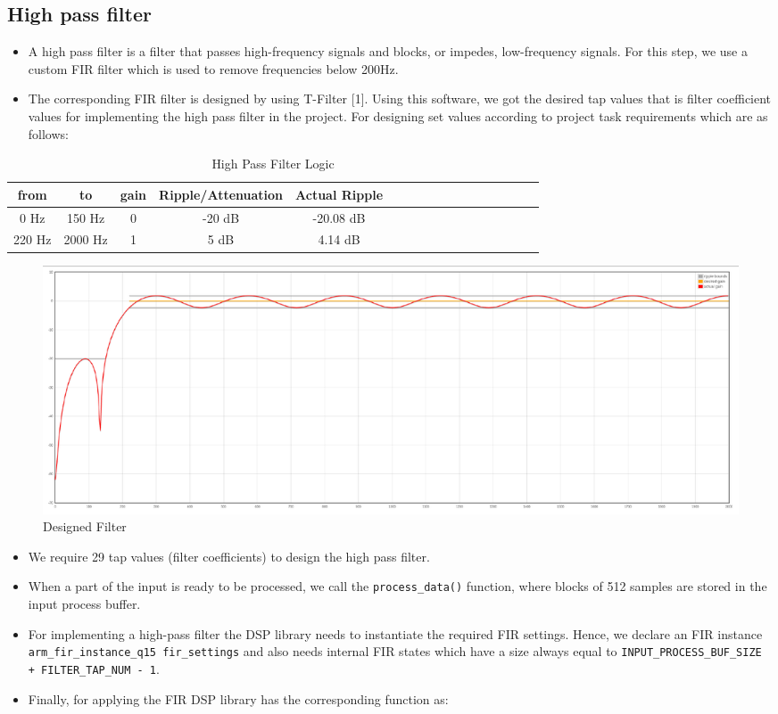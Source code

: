 \documentclass[11pt]{article}
\begin{document}
\subsection{High pass filter}
\label{sec:org4788e25}

\begin{itemize}
\item A high pass filter is a filter that passes high-frequency signals and blocks, or impedes, low-frequency signals. For this step, we use a custom FIR filter which is used to remove frequencies below 200Hz.
\item The corresponding FIR filter is designed by using T-Filter [1]. Using this software, we got the desired tap values that is filter coefficient values for implementing the high pass filter in the project. For designing set values according to project task requirements which are as follows:
\end{itemize}


\begin{table}[htbp]
\caption{High Pass Filter Logic}
\centering
\begin{tabular}{|c|c|c|c|c|c|c|c|c|c|c|c|c|c|c|c|c|}
\hline
from & to & gain & Ripple/Attenuation & Actual Ripple\\[0pt]
\hline
0 Hz & 150 Hz & 0 & -20 dB & -20.08 dB\\[0pt]
220 Hz & 2000 Hz & 1 & 5 dB & 4.14 dB\\[0pt]
\hline
\end{tabular}
\end{table}


\begin{figure}[H]
    \centering
    \includegraphics[width=1\textwidth, trim={0cm 0cm 0cm 0cm}, clip]{Filter.pdf}
    \caption{Designed Filter}
    \end{figure}


\begin{itemize}
\item We require 29 tap values (filter coefficients) to design the high pass filter.
\item When a part of the input is ready to be processed, we call the \texttt{process\_data()} function, where blocks of 512 samples are stored in the input process buffer.
\item For implementing a high-pass filter the DSP library needs to instantiate the required FIR settings. Hence, we declare an FIR instance \texttt{arm\_fir\_instance\_q15 fir\_settings} and also needs internal FIR states which have a size always equal to \texttt{INPUT\_PROCESS\_BUF\_SIZE + FILTER\_TAP\_NUM - 1}.
\item Finally, for applying the FIR DSP library has the corresponding function as:
\end{itemize}
\end{document}
